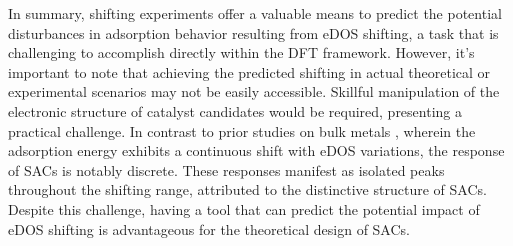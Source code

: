 In summary, shifting experiments offer a valuable means to predict the potential
disturbances in adsorption behavior resulting from eDOS shifting,
a task that is challenging to accomplish directly within the DFT framework.
However, it's important to note that achieving the predicted shifting
in actual theoretical or experimental scenarios may not be easily accessible.
Skillful manipulation of the electronic structure of catalyst candidates would be required,
presenting a practical challenge.
In contrast to prior studies on bulk metals \cite{fung2021machine},
wherein the adsorption energy exhibits a continuous shift with eDOS variations,
the response of SACs is notably discrete.
These responses manifest as isolated peaks throughout the shifting range,
attributed to the distinctive structure of SACs.
Despite this challenge, having a tool that can predict the potential impact of
eDOS shifting is advantageous for the theoretical design of SACs.
